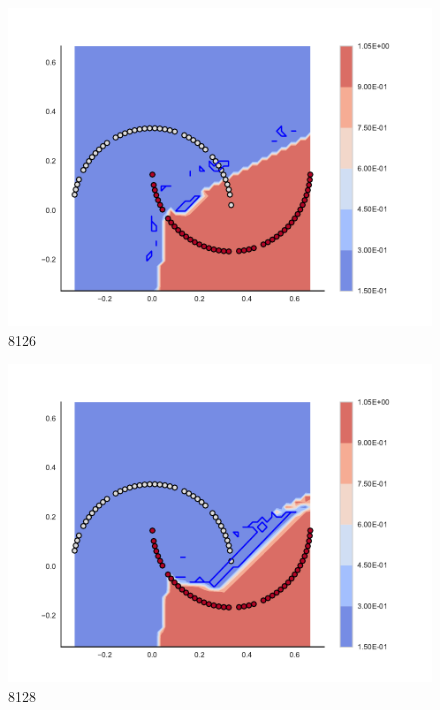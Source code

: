 \begin{subfigure}[b]{0.09\textwidth}
    \includegraphics[clip, trim=2.35cm 1.75cm 4.5cm 0cm,width=\textwidth]{img/convergence/8126.pdf}
    \caption{8126}
    \label{fig:convergence_8126}
\end{subfigure}
%
\begin{subfigure}[b]{0.09\textwidth}
    \includegraphics[clip, trim=2.35cm 1.75cm 4.5cm 0cm,width=\textwidth]{img/convergence/8128.pdf}
    \caption{8128}
    \label{fig:convergence_8128}
\end{subfigure}
%
